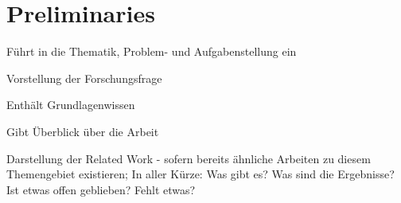 \chapter{Preliminaries}
\label{ch:introduction}

Führt in die Thematik, Problem- und Aufgabenstellung ein

Vorstellung der Forschungsfrage

Enthält Grundlagenwissen

Gibt Überblick über die Arbeit

Darstellung der Related Work - sofern bereits ähnliche Arbeiten zu diesem Themengebiet existieren; In aller Kürze: Was gibt es? Was sind die Ergebnisse? Ist etwas offen geblieben? Fehlt etwas?
